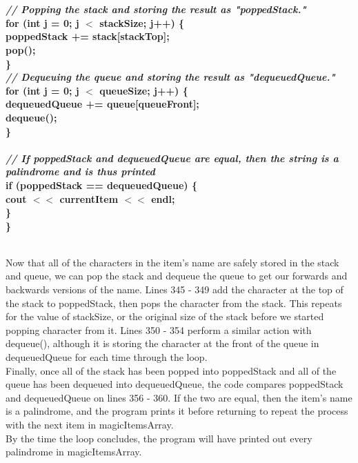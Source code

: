 \documentclass{article}
\begin{document}
\textbf{
\\~\\
        \textit{ \indent \indent // Popping the stack and storing the result as "poppedStack."\\ }
        \indent \indent for (int j = 0; j $<$ stackSize; j++) \{\\
            \indent \indent \indent poppedStack += stack[stackTop];\\
            \indent \indent \indent pop();\\
        \indent \indent \}\\
        \textit{ \indent \indent // Dequeuing the queue and storing the result as "dequeuedQueue."\\ }
        \indent \indent for (int j = 0; j $<$ queueSize; j++) \{\\
            \indent \indent \indent dequeuedQueue += queue[queueFront];\\
            \indent \indent \indent dequeue();\\
        \indent \indent \}\\
\\
        \textit{ \indent \indent // If poppedStack and dequeuedQueue are equal, then the string is a palindrome and is thus printed\\ }
        \indent \indent if (poppedStack == dequeuedQueue) \{\\
            \indent \indent \indent cout $<<$ currentItem $<<$ endl;\\
        \indent \indent \}\\
    \indent \}\\~\\ }

Now that all of the characters in the item's name are safely stored in the stack and queue, we can pop the stack and dequeue the queue to get our forwards and backwards versions of the name. Lines 345 - 349 add the character at the top of the stack to poppedStack, then pops the character from the stack. This repeats for the value of stackSize, or the original size of the stack before we started popping character from it. Lines 350 - 354 perform a similar action with dequeue(), although it is storing the character at the front of the queue in dequeuedQueue for each time through the loop. 
\\ Finally, once all of the stack has been popped into poppedStack and all of the queue has been dequeued into dequeuedQueue, the code compares poppedStack and dequeuedQueue on lines 356 - 360. If the two are equal, then the item's name is a palindrome, and the program prints it before returning to repeat the process with the next item in magicItemsArray.
\\By the time the loop concludes, the program will have printed out every palindrome in magicItemsArray.
\end{document}

